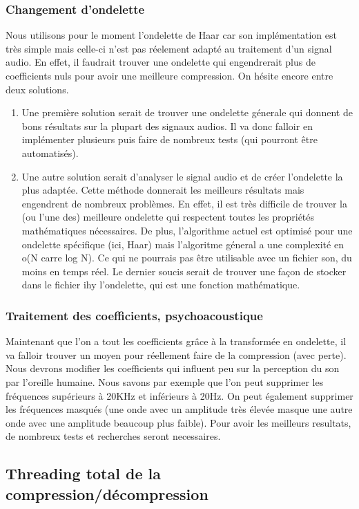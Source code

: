 \documentclass[a4paper,12pt]{article}
\begin{document}
\subsubsection{Changement d'ondelette}
Nous utilisons pour le moment l'ondelette de Haar car son
implémentation est très simple mais celle-ci n'est pas réelement
adapté au traitement d'un signal audio. En effet, il faudrait trouver
une ondelette qui engendrerait plus de coefficients nuls pour avoir
une meilleure compression. On hésite encore entre deux solutions.\\
\begin{enumerate}
\item 
  Une première solution serait de trouver une ondelette génerale qui
  donnent de bons résultats sur la plupart des signaux audios. Il va
  donc falloir en implémenter plusieurs puis faire de nombreux tests
  (qui pourront être automatisés).  
\item 
  Une autre solution serait d'analyser le signal audio et de créer
  l'ondelette la plus adaptée. Cette méthode donnerait les meilleurs
  résultats mais engendrent de nombreux problèmes. En effet, il est
  très difficile de trouver la (ou l'une des) meilleure ondelette qui
  respectent toutes les propriétés mathématiques nécessaires. De plus,
  l'algorithme actuel est optimisé pour une ondelette spécifique (ici,
  Haar) mais l'algoritme géneral a une complexité en o(N carre log N).
  Ce qui ne pourrais pas être utilisable avec un fichier son, du
  moins en temps réel. Le dernier soucis serait de trouver une façon
  de stocker dans le fichier ihy l'ondelette, qui est une fonction
  mathématique.
\end{enumerate}
\subsubsection{Traitement des coefficients, psychoacoustique}
Maintenant que l'on a tout les coefficients grâce à la transformée en
ondelette, il va falloir trouver un moyen pour réellement faire de la
compression (avec perte). Nous devrons modifier les coefficients qui
influent peu sur la perception du son par l'oreille humaine. Nous
savons par exemple que l'on peut supprimer les fréquences supérieurs à
20KHz et inférieurs à 20Hz. On peut également supprimer les fréquences
masqués (une onde avec un amplitude très élevée masque une autre onde
avec une amplitude beaucoup plus faible). Pour avoir les meilleurs
resultats, de nombreux tests et recherches seront necessaires.
	\subsection{Threading total de la compression/décompression}
\end{document}
